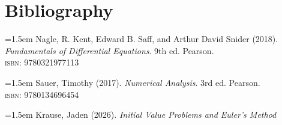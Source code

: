 \documentclass{article}
\begin{document}
\section{Bibliography}
\noindent\hangindent=1.5em 
Nagle, R. Kent, Edward B. Saff, and Arthur David Snider (2018). \textit{Fundamentals of Differential Equations}. 9th ed. Pearson. \\
\hspace*{1.5em}\textsc{isbn}: 9780321977113

\noindent\hangindent=1.5em 
Sauer, Timothy (2017). \textit{Numerical Analysis}. 3rd ed. Pearson. \\
\hspace*{1.5em}\textsc{isbn}: 9780134696454

\noindent\hangindent=1.5em 
Krause, Jaden (2026). \textit{Initial Value Problems and Euler's Method}
\end{document}
